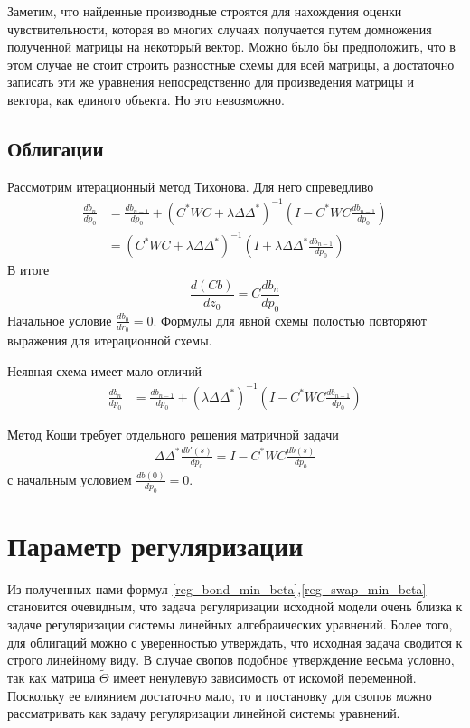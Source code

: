 \documentclass[10pt]{article}
\theoremstyle{definition}
\theoremstyle{remark}
\theoremstyle{plain}
\newcommand{\wt}{\widetilde}
\begin{document}
Заметим, что найденные производные строятся для нахождения оценки чувствительности, которая во многих случаях получается путем домножения полученной матрицы на некоторый вектор. Можно было бы предположить, что в этом случае не стоит строить разностные схемы для всей матрицы, а достаточно записать эти же уравнения непосредственно для  произведения матрицы и вектора, как единого объекта. Но это невозможно. 
\subsection{Облигации}
Рассмотрим итерационный метод Тихонова. Для него спреведливо
\begin{align*}
\frac{db_n}{dp_0} &= \frac{db_{n-1}}{dp_0} + (C^*WC+\lambda\Delta\Delta^*)^{-1}\left(I-C^*WC\frac{db_{n-1}}{dp_0}\right)
\\
&= (C^*WC+\lambda\Delta\Delta^*)^{-1}\left(I+\lambda\Delta\Delta^*\frac{db_{n-1}}{dp_0}\right)
\end{align*}
В итоге $$\frac{d(Cb)}{dz_0} = C\frac{db_n}{dp_0}$$ Начальное условие $\frac{db_0}{dr_0} = 0$. Формулы для явной схемы полостью повторяют выражения для итерационной схемы.

Неявная схема имеет мало отличий
\begin{align*}
\frac{db_n}{dp_0} &= \frac{db_{n-1}}{dp_0} + (\lambda\Delta\Delta^*)^{-1}\left( I - C^*WC\frac{db_{n-1}}{dp_0}\right)
\end{align*}

Метод Коши требует отдельного решения матричной задачи
\begin{align}
\Delta\Delta^*\frac{db'(s)}{dp_0} = I - C^*WC\frac{db(s)}{dp_0}
\end{align}
с начальным условием $\frac{db(0)}{dp_0} = 0$.


\newpage


\section{Параметр регуляризации}
Из полученных нами формул \eqref{reg_bond_min_beta},\eqref{reg_swap_min_beta} становится очевидным, что задача регуляризации исходной модели очень близка к задаче регуляризации системы линейных алгебраических уравнений. Более того, для облигаций можно с уверенностью утверждать, что исходная задача сводится к строго линейному виду. В случае свопов подобное утверждение весьма условно, так как матрица $\wt{\Theta}$ имеет ненулевую зависимость от искомой переменной. Поскольку ее влиянием достаточно мало, то и постановку для свопов можно рассматривать как задачу регуляризации линейной системы уравнений. 
\end{document}
